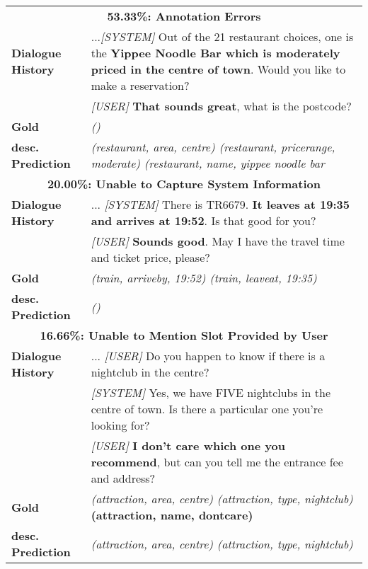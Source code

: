 \documentclass[11pt]{article}
\begin{document}
\begin{table*}[t!]
    \small
    \centering

    \vspace{-0.5\baselineskip}
    \begin{tabular}{lp{12.0cm}}
\toprule
        \multicolumn{2}{c}{\textbf{53.33\%: Annotation Errors}} \\
        \textbf{Dialogue History}  &  ...\textit{[SYSTEM]} Out of the 21 restaurant choices, one is the \textbf{Yippee Noodle Bar which is moderately priced in the centre of town}. Would you like to make a reservation?\\ 
         &  \textit{[USER]} \textbf{That sounds great}, what is the postcode? \\
        \textbf{Gold} &  \textit{()}\\
        \textbf{desc. Prediction} & \textit{(restaurant, area, centre) (restaurant, pricerange, moderate) (restaurant, name, yippee noodle bar}\\
         \midrule
        \multicolumn{2}{c}{\textbf{20.00\%: Unable to Capture System Information}} \\
        \textbf{Dialogue History}  & ... \textit{[SYSTEM]} There is TR6679. \textbf{It leaves at 19:35 and arrives at 19:52}. Is that good for you?\\
        &  \textit{[USER]} \textbf{Sounds good}. May I have the travel time and ticket price, please? \\
        \textbf{Gold} & \textit{(train, arriveby, 19:52) (train, leaveat, 19:35)} \\
        \textbf{desc. Prediction} & \textit{()} \\
         \midrule
        \multicolumn{2}{c}{\textbf{16.66\%: Unable to Mention Slot Provided by User}} \\
        \textbf{Dialogue History}  & ... \textit{[USER]} Do you happen to know if there is a nightclub in the centre?\\ 
        & \textit{[SYSTEM]} Yes, we have FIVE nightclubs in the centre of town. Is there a particular one you're looking for?\\
        &  \textit{[USER]} \textbf{I don't care which one you recommend}, but can you tell me the entrance fee and address?\\ 
        \textbf{Gold} & \textit{(attraction, area, centre)  (attraction, type, nightclub)} \textbf{(attraction, name, dontcare)} \\
        \textbf{desc. Prediction} & \textit{(attraction, area, centre) (attraction, type, nightclub)} \\

\end{tabular}
\end{table*}
\end{document}
